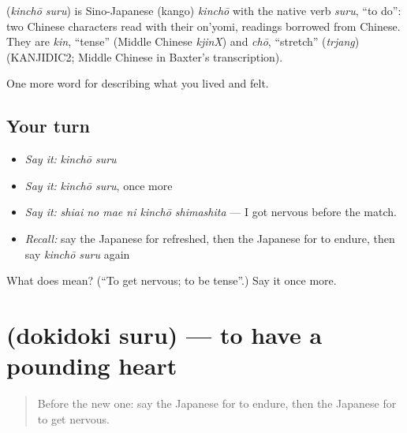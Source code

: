 \begin{cousinweb}
\textbf{} (\emph{kinchō suru}) is Sino-Japanese (kango) \emph{kinchō} with the native verb \emph{suru}, \textquotedblleft{}to do\textquotedblright{}: two Chinese characters read with their on'yomi, readings borrowed from Chinese. They are \emph{kin}, \textquotedblleft{}tense\textquotedblright{} (Middle Chinese \emph{kjinX}) and \emph{chō}, \textquotedblleft{}stretch\textquotedblright{} (\emph{trjang}) (KANJIDIC2; Middle Chinese in Baxter's transcription).
\end{cousinweb}

\begin{grammarlens}[title={What you've built}]
One more word for describing what you lived and felt.
\end{grammarlens}

\subsection*{Your turn}
\begin{itemize}
\raggedright
  \item \emph{Say it:} \emph{kinchō suru}
  \item \emph{Say it:} \emph{kinchō suru}, once more
  \item \emph{Say it:} \emph{shiai no mae ni kinchō shimashita} — I got nervous before the match.
  \item \emph{Recall:} say the Japanese for refreshed, then the Japanese for to endure, then say \emph{kinchō suru} again
\end{itemize}

\begin{tcolorbox}[breakable,colback=teal!4,colframe=teal!35!black,title={Before you move on}]
What does  mean? (\textquotedblleft{}To get nervous; to be tense\textquotedblright{}.) Say it once more.
\end{tcolorbox}
\section[\texorpdfstring{\ja{どきどきする} (dokidoki suru)}{どきどきする (dokidoki suru)}]{ (dokidoki suru) — to have a pounding heart}

\label{lesson:JA-C427-dokidoki-suru}



\begin{quote}
Before the new one: say the Japanese for to endure, then the Japanese for to get nervous.
\end{quote}

